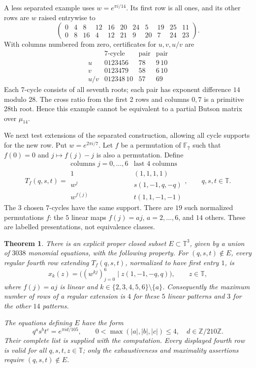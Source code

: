 \documentclass[11pt,a4paper]{article}
\newtheorem{theorem}{Theorem}[section]
\theoremstyle{plain}
\theoremstyle{definition}
\theoremstyle{plain}
\begin{document}
A less separated example uses $w=e^{\pi i/14}$. Its first row is all ones, and its other rows are $w$ raised entrywise to
$$\begin{pmatrix}
0&4&8&12&16&20&24&5&19&25&11\\
0&8&16&4&12&21&9&20&7&24&23
\end{pmatrix}.$$
With columns numbered from zero, certificates for $u,v,u/v$ are
$$\begin{array}{c|c|c|c}
&\text{7-cycle}&\text{pair}&\text{pair}\\\hline
u&0123456&78&9\,10\\
v&0123479&58&6\,10\\
u/v&012348\,10&57&69
\end{array}$$
Each 7-cycle consists of all seventh roots; each pair has exponent difference $14$ modulo $28$. The cross ratio from the first 2 rows and columns $0,7$ is a primitive $28$th root. Hence this example cannot be equivalent to a partial Butson matrix over $\mu_{14}$.

\medskip
We next test extensions of the separated construction, allowing all cycle supports for the new row. Put $w=e^{2\pi i/7}$. Let $f$ be a permutation of $\mathbb F_7$ such that $f(0)=0$ and $j\mapsto f(j)-j$ is also a permutation. Define
\[
T_f(q,s,t)=
\begin{array}{c|c}
\text{columns }j=0,\ldots,6&\text{last 4 columns}\\\hline
1&(1,1,1,1)\\
w^j&s(1,-1,q,-q)\\
w^{f(j)}&t(1,1,-1,-1)
\end{array},\qquad q,s,t\in\mathbb T.
\]
The $3$ chosen $7$-cycles have the same support. There are $19$ such normalized permutations $f$: the $5$ linear maps $f(j)=aj$, $a=2,\ldots,6$, and $14$ others. These are labelled presentations, not equivalence classes.

\par\addvspace{\medskipamount}\noindent
\begin{minipage}{\linewidth}
\begin{theorem}\label{bbb_common:extension}
There is an explicit proper closed subset $E\subset\mathbb T^3$, given by a union of $3038$ monomial equations, with the following property. For $(q,s,t)\notin E$, every regular fourth row extending $T_f(q,s,t)$, normalized to have first entry $1$, is
\[
x_k(z)=\bigl((w^{kj})_{j=0}^6\mid z(1,-1,-q,q)\bigr),\qquad z\in\mathbb T,
\]
where $f(j)=aj$ is linear and $k\in\{2,3,4,5,6\}\setminus\{a\}$. Consequently the maximum number of rows of a regular extension is $4$ for these $5$ linear patterns and $3$ for the other $14$ patterns.

The equations defining $E$ have the form
$$q^a s^b t^c=e^{\pi i d/105},\qquad
0<\max(|a|,|b|,|c|)\le4,\quad d\in\mathbb Z/210\mathbb Z.$$
Their complete list is supplied with the computation. Every displayed fourth row is valid for all $q,s,t,z\in\mathbb T$; only the exhaustiveness and maximality assertions require $(q,s,t)\notin E$.
\end{theorem}
\end{minipage}
\par\addvspace{\medskipamount}
\end{document}
